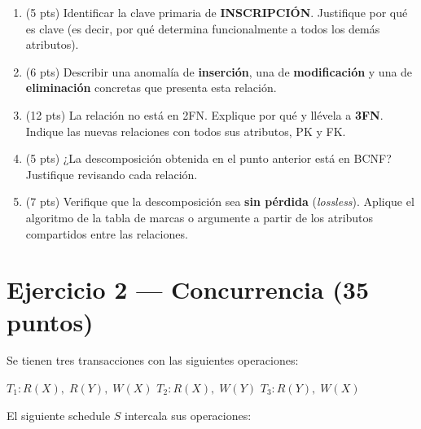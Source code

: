 \documentclass[11pt,a4paper]{article}
\begin{document}
\begin{enumerate}
  \item (5 pts) Identificar la clave primaria de \textbf{INSCRIPCIÓN}. Justifique por qué es clave (es decir, por qué determina funcionalmente a todos los demás atributos).

  \vspace{3.5cm}

  \item (6 pts) Describir una anomalía de \textbf{inserción}, una de \textbf{modificación} y una de \textbf{eliminación} concretas que presenta esta relación.

  \vspace{4cm}

  \item (12 pts) La relación no está en 2FN. Explique por qué y llévela a \textbf{3FN}. Indique las nuevas relaciones con todos sus atributos, PK y FK.

  \vspace{7cm}

  \item (5 pts) ¿La descomposición obtenida en el punto anterior está en BCNF? Justifique revisando cada relación.

  \vspace{3.5cm}

  \item (7 pts) Verifique que la descomposición sea \textbf{sin pérdida} (\textit{lossless}). Aplique el algoritmo de la tabla de marcas o argumente a partir de los atributos compartidos entre las relaciones.

  \vspace{4cm}
\end{enumerate}

\newpage

\section*{Ejercicio 2 — Concurrencia \hfill\normalfont(35 puntos)}

Se tienen tres transacciones con las siguientes operaciones:

\begin{center}
$T_1: R(X),\; R(Y),\; W(X)$ \qquad
$T_2: R(X),\; W(Y)$ \qquad
$T_3: R(Y),\; W(X)$
\end{center}

El siguiente schedule $S$ intercala sus operaciones:
\end{document}
